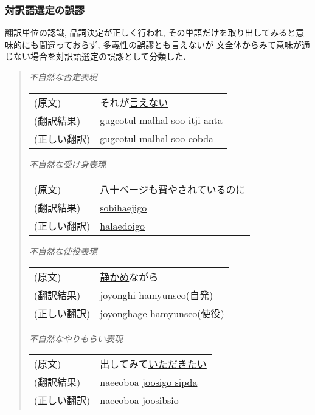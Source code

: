 \subsubsection{対訳語選定の誤謬}
翻訳単位の認識, 品詞決定が正しく行われ, その単語だけを取り出してみると意味的にも間違っておらず, 多義性の誤謬とも言えないが
文全体からみて意味が通じない場合を対訳語選定の誤謬として分類した. 

\begin{quote}
\begin{flushleft}
{\it 不自然な否定表現}
\end{flushleft}

\begin{tabular}{ll}
 (原文)      & それが\underline{言えない} \\
 (翻訳結果)  & gugeotul malhal \underline{soo itji anta} \\
 (正しい翻訳) & gugeotul malhal \underline{soo eobda} \\
\end{tabular}

\vspace{0.5cm}

\begin{flushleft}
{\it 不自然な受け身表現}
\end{flushleft}

\begin{tabular}{ll}
  (原文)     &  八十ページも\underline{費やされ}ているのに \\
  (翻訳結果) &  \underline{sobihaejigo} \\
  (正しい翻訳) & \underline{halaedoigo} \\
\end{tabular}

\vspace{0.5cm}

\begin{flushleft}
{\it 不自然な使役表現}
\end{flushleft}

\begin{tabular}{ll}
 (原文)     &  \underline{静かめ}ながら \\
 (翻訳結果)  & \underline{joyonghi ha}myunseo(自発) \\
 (正しい翻訳) & \underline{joyonghage ha}myunseo(使役) \\
\end{tabular}

\vspace{0.5cm}

\begin{flushleft}
{\it 不自然なやりもらい表現}
\end{flushleft}

\begin{tabular}{ll}
  (原文)     &  出してみて\underline{いただきたい} \\
  (翻訳結果)  & naeeoboa \underline{joosigo sipda} \\
  (正しい翻訳) & naeeoboa \underline{joosibsio} \\
\end{tabular}
\end{quote}

